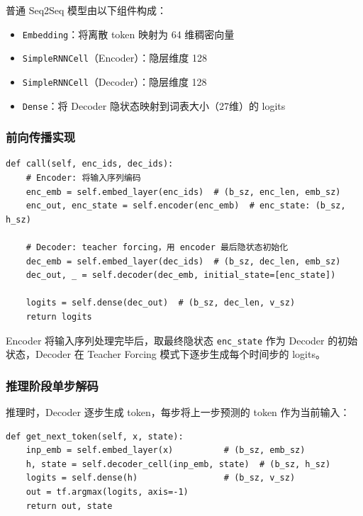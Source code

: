 \documentclass[12pt, a4paper]{article}
\begin{document}
普通 Seq2Seq 模型由以下组件构成：

\begin{itemize}
    \item \texttt{Embedding}：将离散 token 映射为 64 维稠密向量
    \item \texttt{SimpleRNNCell}（Encoder）：隐层维度 128
    \item \texttt{SimpleRNNCell}（Decoder）：隐层维度 128
    \item \texttt{Dense}：将 Decoder 隐状态映射到词表大小（27维）的 logits
\end{itemize}

\subsubsection{前向传播实现}

\begin{lstlisting}[caption={普通 Seq2Seq 模型 call 方法}]
def call(self, enc_ids, dec_ids):
    # Encoder: 将输入序列编码
    enc_emb = self.embed_layer(enc_ids)  # (b_sz, enc_len, emb_sz)
    enc_out, enc_state = self.encoder(enc_emb)  # enc_state: (b_sz, h_sz)

    # Decoder: teacher forcing，用 encoder 最后隐状态初始化
    dec_emb = self.embed_layer(dec_ids)  # (b_sz, dec_len, emb_sz)
    dec_out, _ = self.decoder(dec_emb, initial_state=[enc_state])

    logits = self.dense(dec_out)  # (b_sz, dec_len, v_sz)
    return logits
\end{lstlisting}

Encoder 将输入序列处理完毕后，取最终隐状态 \texttt{enc\_state} 作为 Decoder 的初始状态，Decoder 在 Teacher Forcing 模式下逐步生成每个时间步的 logits。

\subsubsection{推理阶段单步解码}

推理时，Decoder 逐步生成 token，每步将上一步预测的 token 作为当前输入：

\begin{lstlisting}[caption={单步解码 get\_next\_token}]
def get_next_token(self, x, state):
    inp_emb = self.embed_layer(x)          # (b_sz, emb_sz)
    h, state = self.decoder_cell(inp_emb, state)  # (b_sz, h_sz)
    logits = self.dense(h)                 # (b_sz, v_sz)
    out = tf.argmax(logits, axis=-1)
    return out, state
\end{lstlisting}
\end{document}
